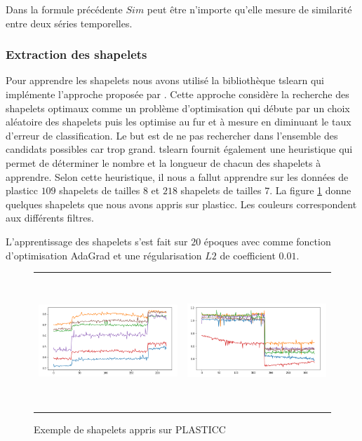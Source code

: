 Dans la formule précédente $ Sim $ peut être n'importe qu'elle mesure de similarité entre deux séries temporelles. 

\subsubsection{Extraction des shapelets}
Pour apprendre les shapelets nous avons utilisé la bibliothèque tslearn\citep{tslearn} qui implémente l'approche proposée par \citet{grabocka2014learning}. Cette approche considère la recherche des shapelets optimaux comme un problème d'optimisation qui débute par un choix aléatoire des shapelets puis les optimise au fur et à mesure en diminuant le taux d'erreur de classification. Le but est de ne pas rechercher dans l'ensemble des candidats possibles car trop grand. tslearn fournit également une heuristique qui permet de déterminer le nombre et la longueur de chacun des shapelets à apprendre. Selon cette heuristique, il nous a fallut apprendre sur les données de plasticc $ 109 $ shapelets de tailles $ 8 $ et $ 218 $ shapelets de tailles $ 7 $. La figure \ref{fig:shapelet_example} donne quelques shapelets que nous avons appris sur plasticc. Les couleurs correspondent aux différents filtres.

L'apprentissage des shapelets s'est fait sur $ 20 $ époques avec comme fonction d'optimisation AdaGrad\cite{duchi2011adaptive} et une régularisation $L2$ de coefficient $ 0.01 $. 

\begin{figure}[!h]
    \centering
    \begin{tabular}{c|c}
         \includegraphics[width=7cm,height=5cm]{report/figures/shapelet.png} & \includegraphics[width=7cm,height=5cm]{report/figures/shapelet2.png}
    \end{tabular}
    \caption{Exemple de shapelets appris sur PLASTICC}
    \label{fig:shapelet_example}
\end{figure}

